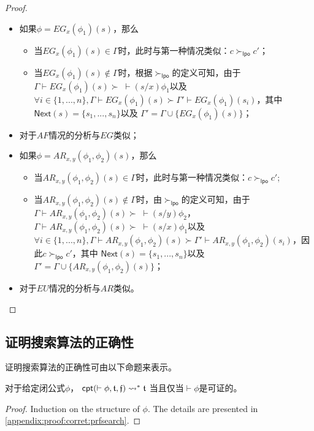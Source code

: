 \begin{proof}
\begin{itemize}
		\item 如果$\phi = EG_x(\phi_1)(s)$，那么
		\begin{itemize}
			\item 当$EG_x(\phi_1)(s)\in \Gamma$时，此时与第一种情况类似：$c\succ_{\mathsf{lpo}}c'$；
			\item 当$EG_x(\phi_1)(s)\not\in \Gamma$时，根据$\succ_{\mathsf{lpo}}$的定义可知，由于$\Gamma\vdash EG_x(\phi_1)(s) \succ \;\vdash(s/x)\phi_1$以及$\forall i\in\{1,...,n\}, \Gamma\vdash EG_x(\phi_1)(s) \succ \Gamma'\vdash EG_x(\phi_1)(s_i)$，其中$\textsf{Next}(s)=\{s_1,...,s_n\}$以及 $\Gamma'=\Gamma\cup\{EG_x(\phi_1)(s)\}$；
		\end{itemize}
		\item 对于$AF$情况的分析与$EG$类似；
		\item 如果$\phi = AR_{x,y}(\phi_1,\phi_2)(s)$，那么
		\begin{itemize}
			\item 当$AR_{x,y}(\phi_1,\phi_2)(s) \in \Gamma$时，此时与第一种情况类似：$c\succ_{\mathsf{lpo}}c'$;
			\item 当$AR_{x,y}(\phi_1,\phi_2)(s) \notin \Gamma$时，由$\succ_{\mathsf{lpo}}$的定义可知，由于$\Gamma\vdash AR_{x,y}(\phi_1,\phi_2)(s) \succ \;\vdash (s/y)\phi_2$， $\Gamma\vdash AR_{x,y}(\phi_1,\phi_2)(s) \succ \;\vdash (s/x)\phi_1$以及$\forall i\in\{1,...,n\}, \Gamma\vdash AR_{x,y}(\phi_1,\phi_2)(s) \succ \Gamma'\vdash AR_{x,y}(\phi_1,\phi_2)(s_i)$，因此$c\succ_{\mathsf{lpo}} c'$，其中 $\textsf{Next}(s)=\{s_1,...,s_n\}$以及 $\Gamma'=\Gamma\cup\{AR_{x,y}(\phi_1,\phi_2)(s)\}$；
		\end{itemize}
		\item 对于$EU$情况的分析与$AR$类似。
	\end{itemize}
\end{proof}

\subsection{证明搜索算法的正确性}\label{subsec:cpt:correctness}
证明搜索算法的正确性可由以下命题来表示。
\begin{proposition}[证明搜索算法的正确性]
	对于给定闭公式$\phi$， 
	$\textsf{cpt}(\vdash\phi, \mathfrak{t}, \mathfrak{f}) \rightsquigarrow^* \mathfrak{t}$ 当且仅当$\vdash \phi$是可证的。
\end{proposition}

\begin{proof}
	Induction on the structure of $\phi$. The details are presented in 
	\ref{appendix:proof:corret:prfsearch}.
\end{proof}

